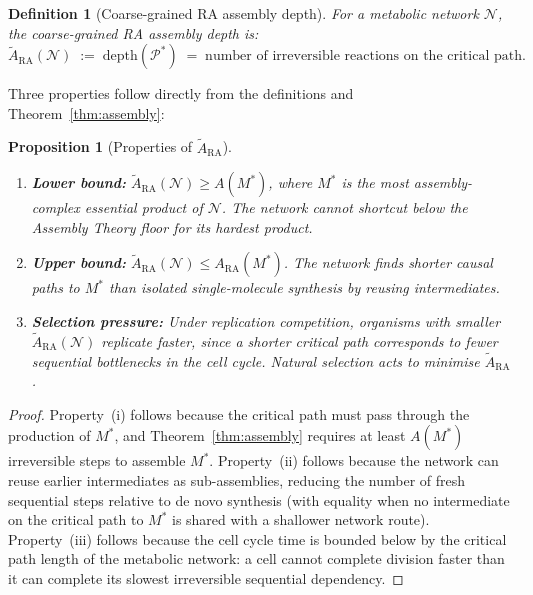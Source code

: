 \documentclass[11pt,a4paper]{article}
\newtheorem{definition}[theorem]{Definition}
\newtheorem{proposition}[theorem]{Proposition}
\theoremstyle{remark}
\newcommand{\ARA}{A_{\mathrm{RA}}}
\begin{document}
\begin{definition}[Coarse-grained RA assembly depth]
\label{def:cgara}
For a metabolic network $\mathcal{N}$, the \emph{coarse-grained RA assembly
depth} is:
\begin{equation}
  \tilde{A}_{\mathrm{RA}}(\mathcal{N})
  \;:=\; \mathrm{depth}(\mathcal{P}^*)
  \;=\; \text{number of irreversible reactions on the critical path.}
  \label{eq:cgara}
\end{equation}
\end{definition}

Three properties follow directly from the definitions and
Theorem~\ref{thm:assembly}:

\begin{proposition}[Properties of $\tilde{A}_{\mathrm{RA}}$]
\label{prop:cgara}
\leavevmode
\begin{enumerate}[label=\emph{(\roman*)},noitemsep]
  \item \textbf{Lower bound:}
  $\tilde{A}_{\mathrm{RA}}(\mathcal{N}) \geq A(M^*)$, where $M^*$ is the
  most assembly-complex essential product of $\mathcal{N}$. The network
  cannot shortcut below the Assembly Theory floor for its hardest product.
  \item \textbf{Upper bound:}
  $\tilde{A}_{\mathrm{RA}}(\mathcal{N}) \leq \ARA(M^*)$. The network
  finds shorter causal paths to $M^*$ than isolated single-molecule synthesis
  by reusing intermediates.
  \item \textbf{Selection pressure:}
  Under replication competition, organisms with smaller
  $\tilde{A}_{\mathrm{RA}}(\mathcal{N})$ replicate faster, since a
  shorter critical path corresponds to fewer sequential bottlenecks
  in the cell cycle. Natural selection acts to minimise
  $\tilde{A}_{\mathrm{RA}}$.
\end{enumerate}
\end{proposition}

\begin{proof}
Property~(i) follows because the critical path must pass through the
production of $M^*$, and Theorem~\ref{thm:assembly} requires at least
$A(M^*)$ irreversible steps to assemble $M^*$. Property~(ii) follows because
the network can reuse earlier intermediates as sub-assemblies, reducing the
number of fresh sequential steps relative to de novo synthesis (with equality
when no intermediate on the critical path to $M^*$ is shared with a shallower
network route). Property~(iii)
follows because the cell cycle time is bounded below by the critical path
length of the metabolic network: a cell cannot complete division faster
than it can complete its slowest irreversible sequential dependency.
\end{proof}
\end{document}
